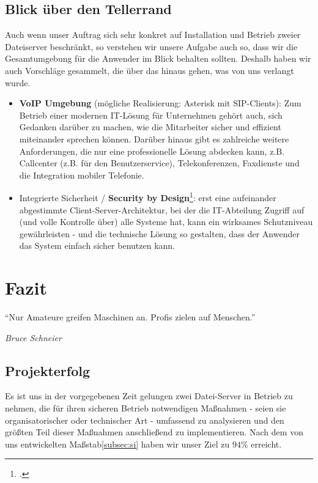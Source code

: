 \subsection{Blick über den Tellerrand}
\label{subsec:tellerrand}
Auch wenn unser Auftrag sich sehr konkret auf Installation und Betrieb zweier Dateiserver beschränkt, so verstehen wir unsere Aufgabe auch so, dass wir die Gesamtumgebung für die Anwender im Blick behalten sollten. Deshalb haben wir auch Vorschläge gesammelt, die über das hinaus gehen, was von uns verlangt wurde.
\begin{itemize}
\item \textbf{VoIP Umgebung} (mögliche Realisierung: Asterisk mit SIP-Clients): Zum Betrieb einer modernen IT-Lösung für Unternehmen gehört auch, sich Gedanken darüber zu machen, wie die Mitarbeiter sicher und effizient miteinander sprechen können. Darüber hinaus gibt es zahlreiche weitere Anforderungen, die nur eine professionelle Lösung abdecken kann, z.B. Callcenter (z.B. für den Benutzerservice), Telekonferenzen, Faxdienste und die Integration mobiler Telefonie.
\item Integrierte Sicherheit / \textbf{Security by Design}\footcite{waidner2013entwicklung}: erst eine aufeinander abgestimmte Client-Server-Architektur, bei der die IT-Abteilung Zugriff auf (und volle Kontrolle über) alle Systeme hat, kann ein wirksames Schutzniveau gewährleisten - und die technische Lösung so gestalten, dass der Anwender das System einfach sicher benutzen kann.
\end{itemize}
\newpage
\section{Fazit}
\setlength{\epigraphwidth}{.4\textwidth}
\epigraph{"`Nur Amateure greifen Maschinen an. Profis zielen auf Menschen."'}{\textit{Bruce Schneier}}

\subsection{Projekterfolg}
Es ist uns in der vorgegebenen Zeit gelungen zwei Datei-Server in Betrieb zu nehmen, die für ihren sicheren Betrieb notwendigen Maßnahmen - seien sie organisatorischer oder technischer Art - umfassend zu analysieren und den größten Teil dieser Maßnahmen anschließend zu implementieren. Nach dem von uns entwickelten Maßstab\ref{subsec:si} haben wir unser Ziel zu $94\%$ erreicht. \\

